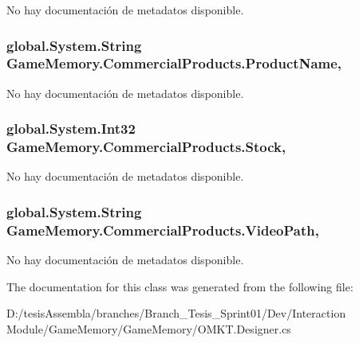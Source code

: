 No hay documentación de metadatos disponible. 

\hypertarget{class_game_memory_1_1_commercial_products_a1ecd53e23a0d6730619c832d2baa96a6}{
\subsubsection[{Product\-Name}]{\setlength{\rightskip}{0pt plus 5cm}global.\-System.\-String Game\-Memory.\-Commercial\-Products.\-Product\-Name\hspace{0.3cm}{\ttfamily [get]}, {\ttfamily [set]}}}\label{class_game_memory_1_1_commercial_products_a1ecd53e23a0d6730619c832d2baa96a6}


No hay documentación de metadatos disponible. 

\hypertarget{class_game_memory_1_1_commercial_products_a647e99bd36a3dc48c7b14fafc499f027}{
\subsubsection[{Stock}]{\setlength{\rightskip}{0pt plus 5cm}global.\-System.\-Int32 Game\-Memory.\-Commercial\-Products.\-Stock\hspace{0.3cm}{\ttfamily [get]}, {\ttfamily [set]}}}\label{class_game_memory_1_1_commercial_products_a647e99bd36a3dc48c7b14fafc499f027}


No hay documentación de metadatos disponible. 

\hypertarget{class_game_memory_1_1_commercial_products_a62c8035a92098f4485b3aa532844cfed}{
\subsubsection[{Video\-Path}]{\setlength{\rightskip}{0pt plus 5cm}global.\-System.\-String Game\-Memory.\-Commercial\-Products.\-Video\-Path\hspace{0.3cm}{\ttfamily [get]}, {\ttfamily [set]}}}\label{class_game_memory_1_1_commercial_products_a62c8035a92098f4485b3aa532844cfed}


No hay documentación de metadatos disponible. 



The documentation for this class was generated from the following file\-:\begin{DoxyCompactItemize}
\item 
D\-:/tesis\-Assembla/branches/\-Branch\-\_\-\-Tesis\-\_\-\-Sprint01/\-Dev/\-Interaction Module/\-Game\-Memory/\-Game\-Memory/O\-M\-K\-T.\-Designer.\-cs\end{DoxyCompactItemize}
